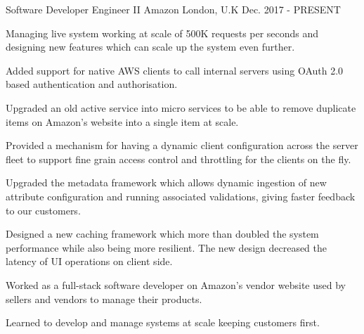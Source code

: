 

\begin{cventries}

  \cventry
    {Software Developer Engineer II} %
    {Amazon} %
    {London, U.K} %
    {Dec. 2017 - PRESENT} %
    {
      \begin{cvitems} %
        \item {Managing live system working at scale of 500K requests per seconds and designing new features which can scale up the system even further.}
        \item {Added support for native AWS clients to call internal servers using OAuth 2.0 based authentication and authorisation.}
        \item {Upgraded an old active service into micro services to be able to remove duplicate items on Amazon's website into a single item at scale.}
        \item {Provided a mechanism for having a dynamic client configuration across the server fleet to support fine grain access control and throttling for the clients on the fly.}
        \item {Upgraded the metadata framework which allows dynamic ingestion of new attribute configuration and running associated validations, giving faster feedback to our customers.}
        \item {Designed a new caching framework which more than doubled the system performance while also being more resilient. The new design decreased the latency of UI operations on client side.}
        \item {Worked as a full-stack software developer on Amazon's vendor website used by sellers and vendors to manage their products.}
        \item {Learned to develop and manage systems at scale keeping customers first.}
      \end{cvitems}
    }


\end{cventries}
